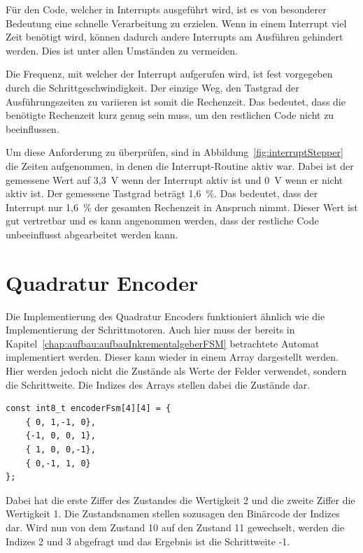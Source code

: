 Für den Code, welcher in Interrupts ausgeführt wird, ist es von besonderer Bedeutung eine schnelle Verarbeitung zu erzielen.
Wenn in einem Interrupt viel Zeit benötigt wird, können dadurch andere Interrupts am Ausführen gehindert werden.
Dies ist unter allen Umständen zu vermeiden.

Die Frequenz, mit welcher der Interrupt aufgerufen wird, ist fest vorgegeben durch die Schrittgeschwindigkeit.
Der einzige Weg, den Tastgrad der Ausführungszeiten zu variieren ist somit die Rechenzeit.
Das bedeutet, dass die benötigte Rechenzeit kurz genug sein muss, um den restlichen Code nicht zu beeinflussen.

Um diese Anforderung zu überprüfen, sind in Abbildung~\ref{fig:interruptStepper} die Zeiten aufgenommen, in denen die Interrupt-Routine aktiv war.
Dabei ist der gemessene Wert auf 3,3~V wenn der Interrupt aktiv ist und 0~V wenn er nicht aktiv ist.
Der gemessene Tastgrad beträgt 1,6~\%.
Das bedeutet, dass der Interrupt nur 1,6~\% der gesamten Rechenzeit in Anspruch nimmt.
Dieser Wert ist gut vertretbar und es kann angenommen werden, dass der restliche Code unbeeinflusst abgearbeitet werden kann.



\section{Quadratur Encoder}	
Die Implementierung des Quadratur Encoders funktioniert ähnlich wie die Implementierung der Schrittmotoren.
Auch hier muss der bereits in Kapitel~\ref{chap:aufbau:aufbauInkrementalgeberFSM} betrachtete Automat implementiert werden.
Dieser kann wieder in einem Array dargestellt werden.
Hier werden jedoch nicht die Zustände als Werte der Felder verwendet, sondern die Schrittweite.
Die Indizes des Arrays stellen dabei die Zustände dar.

\begin{minipage}{\textwidth}
\begin{lstlisting}
const int8_t encoderFsm[4][4] = {
	{ 0, 1,-1, 0},
	{-1, 0, 0, 1},
	{ 1, 0, 0,-1},
	{ 0,-1, 1, 0}
};
\end{lstlisting}
\end{minipage}

Dabei hat die erste Ziffer des Zustandes die Wertigkeit 2 und die zweite Ziffer die Wertigkeit 1.
Die Zustandsnamen stellen sozusagen den Binärcode der Indizes dar.
Wird nun von dem Zustand 10 auf den Zustand 11 gewechselt, werden die Indizes 2 und 3 abgefragt und das Ergebnis ist die Schrittweite -1.

